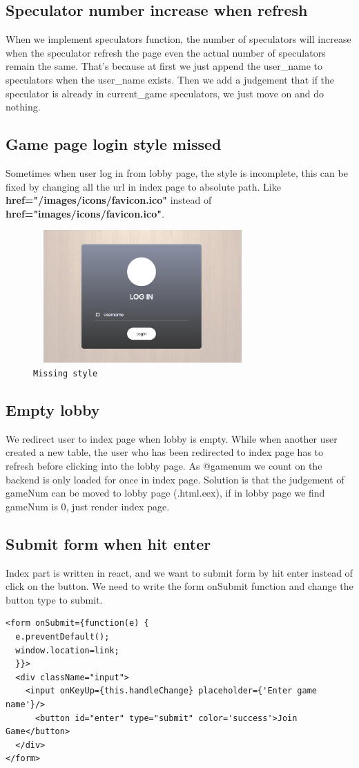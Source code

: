 \subsection{Speculator number increase when refresh} When we implement 
speculators function, the number of speculators will increase when the speculator 
refresh the page even the actual number of speculators remain the same. That's 
because at first we just append the user\_name to speculators when the user\_name
exists. Then we add a judgement that if the speculator is already in current\_game
speculators, we just move on and do nothing.
\subsection{Game page login style missed} Sometimes when user log in from lobby page,
the style is incomplete, this can be fixed by changing all the url in index page
to absolute path. Like {\bf href="/images/icons/favicon.ico"} instead of 
{\bf href="images/icons/favicon.ico"}.
\begin{figure}[!htb]
\includegraphics[height=2.0in, width=3.3in]{stylemiss.png}
\caption{\texttt{Missing style}}
\end{figure}
\subsection{Empty lobby} We redirect user to index page when lobby is empty. While 
when another user created a new table, the user who has been redirected to index
page has to refresh before clicking into the lobby page. As @gamenum we count on the backend
 is only loaded for once in index page. Solution is that the judgement of gameNum 
 can be moved to lobby page (.html.eex), if in lobby page we find gameNum is 0, 
 just render index page.
\subsection{Submit form when hit enter} Index part is written in react, and
we want to submit form by hit enter instead of click on the button. We need
to write the form onSubmit function and change the button type to submit.
\begin{lstlisting}
<form onSubmit={function(e) {
  e.preventDefault();
  window.location=link;
  }}>
  <div className="input">
    <input onKeyUp={this.handleChange} placeholder={'Enter game name'}/>
      <button id="enter" type="submit" color='success'>Join Game</button>
  </div>
</form>
\end{lstlisting}




